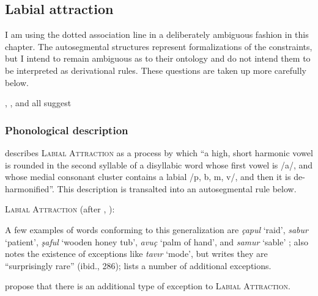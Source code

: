 \subsection{Labial attraction}

I am using the dotted association line in a deliberately ambiguous fashion in this chapter. The autosegmental structures represent formalizations of the constraints, but I intend to remain ambiguous as to their ontology and do not intend them to be interpreted as derivational rules. These questions are taken up more carefully below.

\citet{Clements1982}

\citet{Zimmer1969}, \citet{Zuraw2000}, and \citet{Inkelas2001} all suggest

\subsubsection{Phonological description}

\citet[][36]{Lees1966a} describes \textsc{Labial Attraction} as a process by which ``a high, short harmonic vowel is rounded in the second syllable of a disyllabic word whose first vowel is /a/, and whose medial consonant cluster contains a labial /p, b, m, v/, and then it is de-harmonified''. This description is transalted into an autosegmental rule below.

\ex \textsc{Labial Attraction} (after \citealt[][286]{Lees1966b}, \citealt[][171]{Inkelas2001}): \\
\xe

\noindent
A few examples of words conforming to this generalization are \emph{çapul} `raid', \emph{sabur} `patient', \emph{şaful} `wooden honey tub', \emph{avuç} `palm of hand', and \emph{samur} `sable' \citep[][285]{Lees1966b}; \citeauthor{Lees1966b} also notes the existence of exceptions like \emph{tavır} `mode', but writes they are ``surprisingly rare'' (ibid., 286); \citet[][225]{Clements1982} lists a number of additional exceptions.

\citeauthor{Clements1982} propose that there is an additional type of exception to \textsc{Labial Attraction}.

